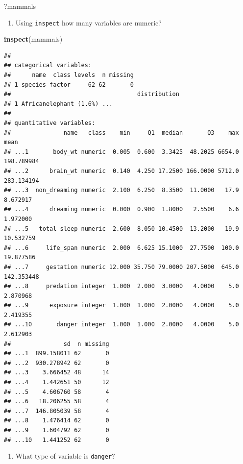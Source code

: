 \documentclass[
]{book}
\newenvironment{Shaded}{\begin{snugshade}}{\end{snugshade}}
\newcommand{\KeywordTok}[1]{\textcolor[rgb]{0.13,0.29,0.53}{\textbf{#1}}}
\newcommand{\NormalTok}[1]{#1}
\providecommand{\tightlist}{%
  \setlength{\itemsep}{0pt}\setlength{\parskip}{0pt}}
\begin{document}
\begin{Shaded}
\begin{Highlighting}[]
\NormalTok{?mammals}
\end{Highlighting}
\end{Shaded}

\begin{enumerate}
\def\labelenumi{\alph{enumi}.}
\setcounter{enumi}{1}
\tightlist
\item
  Using \texttt{inspect} how many variables are numeric?
\end{enumerate}

\begin{Shaded}
\begin{Highlighting}[]
\KeywordTok{inspect}\NormalTok{(mammals)}
\end{Highlighting}
\end{Shaded}

\begin{verbatim}
## 
## categorical variables:  
##      name  class levels  n missing
## 1 species factor     62 62       0
##                                    distribution
## 1 Africanelephant (1.6%) ...                   
## 
## quantitative variables:  
##               name   class    min     Q1  median       Q3    max       mean
## ...1       body_wt numeric  0.005  0.600  3.3425  48.2025 6654.0 198.789984
## ...2      brain_wt numeric  0.140  4.250 17.2500 166.0000 5712.0 283.134194
## ...3  non_dreaming numeric  2.100  6.250  8.3500  11.0000   17.9   8.672917
## ...4      dreaming numeric  0.000  0.900  1.8000   2.5500    6.6   1.972000
## ...5   total_sleep numeric  2.600  8.050 10.4500  13.2000   19.9  10.532759
## ...6     life_span numeric  2.000  6.625 15.1000  27.7500  100.0  19.877586
## ...7     gestation numeric 12.000 35.750 79.0000 207.5000  645.0 142.353448
## ...8     predation integer  1.000  2.000  3.0000   4.0000    5.0   2.870968
## ...9      exposure integer  1.000  1.000  2.0000   4.0000    5.0   2.419355
## ...10       danger integer  1.000  1.000  2.0000   4.0000    5.0   2.612903
##               sd  n missing
## ...1  899.158011 62       0
## ...2  930.278942 62       0
## ...3    3.666452 48      14
## ...4    1.442651 50      12
## ...5    4.606760 58       4
## ...6   18.206255 58       4
## ...7  146.805039 58       4
## ...8    1.476414 62       0
## ...9    1.604792 62       0
## ...10   1.441252 62       0
\end{verbatim}

\begin{enumerate}
\def\labelenumi{\alph{enumi}.}
\setcounter{enumi}{2}
\tightlist
\item
  What type of variable is \texttt{danger}?
\end{enumerate}
\end{document}

